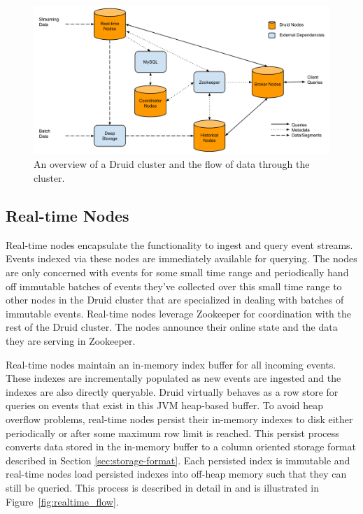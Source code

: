\documentclass{acm_proc_article-sp}
\begin{document}
\begin{figure}
\centering
\includegraphics[width = 4.5in]{cluster}
\caption{An overview of a Druid cluster and the flow of data through the cluster.}
\label{fig:cluster}
\end{figure}

\newpage
\subsection{Real-time Nodes}
\label{sec:realtime}
Real-time nodes encapsulate the functionality to ingest and query event
streams. Events indexed via these nodes are immediately available for querying.
The nodes are only concerned with events for some small time range and
periodically hand off immutable batches of events they've collected over this
small time range to other nodes in the Druid cluster that are specialized in
dealing with batches of immutable events. Real-time nodes leverage Zookeeper
\cite{hunt2010zookeeper} for coordination with the rest of the Druid cluster.
The nodes announce their online state and the data they are serving in
Zookeeper. 

Real-time nodes maintain an in-memory index buffer for all incoming events.
These indexes are incrementally populated as new events are ingested and the
indexes are also directly queryable.  Druid virtually behaves as a row store
for queries on events that exist in this JVM heap-based buffer. To avoid heap
overflow problems, real-time nodes persist their in-memory indexes to disk
either periodically or after some maximum row limit is reached. This persist
process converts data stored in the in-memory buffer to a column oriented
storage format described in Section \ref{sec:storage-format}. Each persisted
index is immutable and real-time nodes load persisted indexes into off-heap
memory such that they can still be queried. This process is described in detail
in \cite{o1996log} and is illustrated in Figure~\ref{fig:realtime_flow}.
\end{document}
